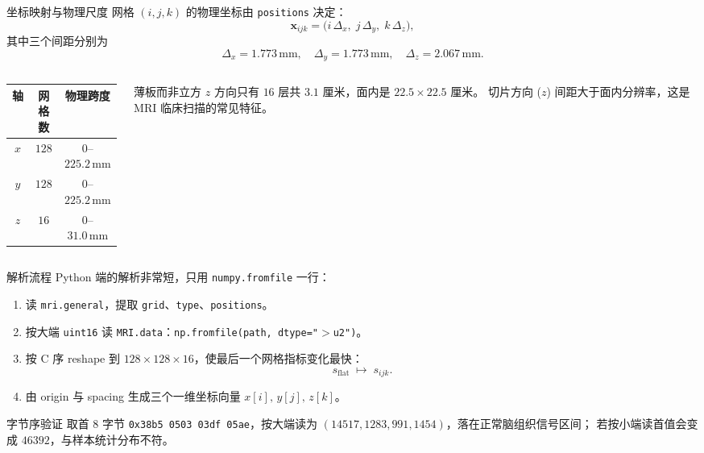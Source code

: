 \documentclass[aspectratio=169,11pt]{ctexbeamer}
\newcommand{\vx}{\mathbf x}
\begin{document}
\begin{frame}{坐标映射与物理尺度}
  \small
  网格 $(i,j,k)$ 的物理坐标由 \texttt{positions} 决定：
  \[
    \vx_{ijk}=
    \bigl(i\,\Delta_x,\; j\,\Delta_y,\; k\,\Delta_z\bigr),
  \]
  其中三个间距分别为
  \[
    \Delta_x=1.773\,\mathrm{mm},\quad
    \Delta_y=1.773\,\mathrm{mm},\quad
    \Delta_z=2.067\,\mathrm{mm}.
  \]

  \begin{columns}
    \begin{column}{0.50\linewidth}
      \begin{tabular}{ccc}
        \toprule
        轴 & 网格数 & 物理跨度 \\
        \midrule
        $x$ & $128$ & $0$--$225.2\,\mathrm{mm}$ \\
        $y$ & $128$ & $0$--$225.2\,\mathrm{mm}$ \\
        $z$ & $16$  & $0$--$31.0\,\mathrm{mm}$ \\
        \bottomrule
      \end{tabular}
    \end{column}
    \begin{column}{0.46\linewidth}
      \begin{block}{薄板而非立方}
        $z$ 方向只有 $16$ 层共 $3.1$ 厘米，面内是 $22.5\times 22.5$ 厘米。
        切片方向 ($z$) 间距大于面内分辨率，这是 MRI 临床扫描的常见特征。
      \end{block}
    \end{column}
  \end{columns}
\end{frame}

\begin{frame}{解析流程}
  \small
  Python 端的解析非常短，只用 \texttt{numpy.fromfile} 一行：

  \begin{enumerate}
    \item 读 \texttt{mri.general}，提取 \texttt{grid}、\texttt{type}、\texttt{positions}。
    \item 按大端 \texttt{uint16} 读 \texttt{MRI.data}：\texttt{np.fromfile(path, dtype="$>$u2")}。
    \item 按 C 序 reshape 到 $128\times 128\times 16$，使最后一个网格指标变化最快：
      \[
        s_{\mathrm{flat}}\;\longmapsto\;s_{ijk}.
      \]
    \item 由 origin 与 spacing 生成三个一维坐标向量 $x[i],\,y[j],\,z[k]$。
  \end{enumerate}

  \begin{block}{字节序验证}
    取首 $8$ 字节 \texttt{0x38b5\,0503\,03df\,05ae}，按大端读为
    $(14517,1283,991,1454)$，落在正常脑组织信号区间；
    若按小端读首值会变成 $46392$，与样本统计分布不符。
  \end{block}
\end{frame}
\end{document}
